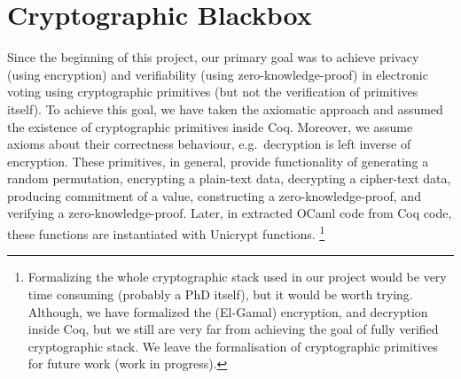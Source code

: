 \section{Cryptographic Blackbox}
Since the beginning of this project, our primary goal was 
to achieve privacy (using encryption) and verifiability (using zero-knowledge-proof) in electronic voting 
using cryptographic primitives (but not the verification of primitives itself). 
To achieve this goal, we have 
taken the axiomatic approach and assumed the existence of cryptographic primitives 
inside Coq. Moreover, we assume axioms about their correctness behaviour, e.g.~decryption 
is left inverse of encryption. These primitives, in general, provide functionality 
of generating a random permutation, encrypting a plain-text data, decrypting a cipher-text data, 
producing commitment of a value, constructing a zero-knowledge-proof, 
and verifying a zero-knowledge-proof. Later, in extracted OCaml code from Coq code, these functions are instantiated 
with Unicrypt \citep{LocherH14} functions. 
\footnote{Formalizing the whole cryptographic stack used in our 
project would be very time consuming (probably a PhD itself), but it would be worth trying. 
Although, we have formalized the (El-Gamal) encryption, and decryption inside Coq, but we still 
are very far from achieving the goal of fully verified cryptographic stack.  We leave the formalisation 
of cryptographic primitives for future work (work in progress).}




